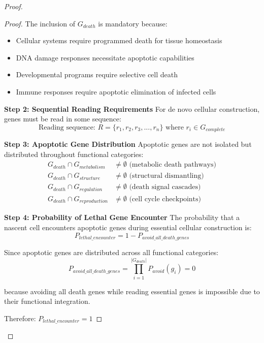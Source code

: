 \documentclass[12pt,a4paper]{article}
\begin{document}
\begin{proof}
\begin{proof}
The inclusion of $G_{death}$ is mandatory because:
\begin{itemize}
\item Cellular systems require programmed death for tissue homeostasis
\item DNA damage responses necessitate apoptotic capabilities
\item Developmental programs require selective cell death
\item Immune responses require apoptotic elimination of infected cells
\end{itemize}

\textbf{Step 2: Sequential Reading Requirements}
For de novo cellular construction, genes must be read in some sequence:
\begin{equation}
\text{Reading sequence: } R = \{r_1, r_2, r_3, ..., r_n\} \text{ where } r_i \in G_{complete}
\end{equation}

\textbf{Step 3: Apoptotic Gene Distribution}
Apoptotic genes are not isolated but distributed throughout functional categories:
\begin{align}
G_{death} \cap G_{metabolism} &\neq \emptyset \text{ (metabolic death pathways)} \\
G_{death} \cap G_{structure} &\neq \emptyset \text{ (structural dismantling)} \\
G_{death} \cap G_{regulation} &\neq \emptyset \text{ (death signal cascades)} \\
G_{death} \cap G_{reproduction} &\neq \emptyset \text{ (cell cycle checkpoints)}
\end{align}

\textbf{Step 4: Probability of Lethal Gene Encounter}
The probability that a nascent cell encounters apoptotic genes during essential cellular construction is:
\begin{equation}
P_{lethal\_encounter} = 1 - P_{avoid\_all\_death\_genes}
\end{equation}

Since apoptotic genes are distributed across all functional categories:
\begin{equation}
P_{avoid\_all\_death\_genes} = \prod_{i=1}^{|G_{death}|} P_{avoid}(g_i) = 0
\end{equation}

because avoiding all death genes while reading essential genes is impossible due to their functional integration.

Therefore: $P_{lethal\_encounter} = 1$


\end{proof}
\end{proof}
\end{document}
